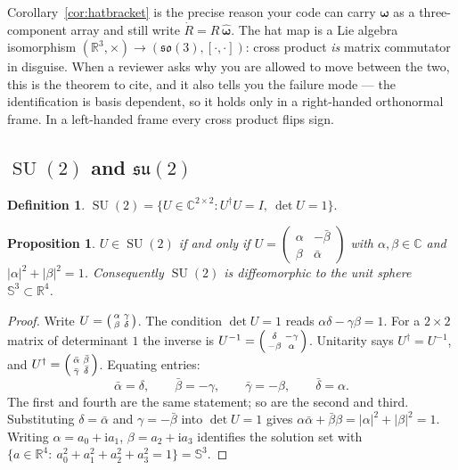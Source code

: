 \documentclass[11pt]{article}
\DeclareMathOperator{\SU}{SU}
\newcommand{\so}{\mathfrak{so}}
\newcommand{\su}{\mathfrak{su}}
\newcommand{\R}{\mathbb{R}}
\newcommand{\C}{\mathbb{C}}
\newcommand{\Sph}{\mathbb{S}}
\newcommand{\hatmap}[1]{\widehat{#1}}
\newcommand{\ii}{\mathrm{i}}
\theoremstyle{plain}
\newtheorem{proposition}[theorem]{Proposition}
\theoremstyle{definition}
\newtheorem{definition}[theorem]{Definition}
\begin{document}
\begin{practical}
Corollary~\ref{cor:hatbracket} is the precise reason your code can carry $\bm\omega$ as a
three-component array and still write $\dot R=R\,\hatmap{\bm\omega}$. The hat map is a Lie algebra
isomorphism $(\R^3,\times)\to(\so(3),[\cdot,\cdot])$: cross product \emph{is} matrix commutator in
disguise. When a reviewer asks why you are allowed to move between the two, this is the theorem to
cite, and it also tells you the failure mode --- the identification is basis dependent, so it holds
only in a right-handed orthonormal frame. In a left-handed frame every cross product flips sign.
\end{practical}

\subsection{$\SU(2)$ and $\su(2)$}

\begin{definition}
$\SU(2)=\{U\in\C^{2\times2}: U^{\dagger}U=I,\ \det U=1\}$.
\end{definition}

\begin{proposition}\label{prop:su2form}
$U\in\SU(2)$ if and only if
$U=\begin{pmatrix}\alpha&-\bar\beta\\ \beta&\bar\alpha\end{pmatrix}$
with $\alpha,\beta\in\C$ and $|\alpha|^2+|\beta|^2=1$. Consequently $\SU(2)$ is diffeomorphic to
the unit sphere $\Sph^3\subset\R^4$.
\end{proposition}

\begin{proof}
Write $U=\begin{psmallmatrix}\alpha&\gamma\\\beta&\delta\end{psmallmatrix}$. The condition
$\det U=1$ reads $\alpha\delta-\gamma\beta=1$. For a $2\times2$ matrix of determinant $1$ the
inverse is $U^{-1}=\begin{psmallmatrix}\delta&-\gamma\\-\beta&\alpha\end{psmallmatrix}$. Unitarity
says $U^{\dagger}=U^{-1}$, and
$U^{\dagger}=\begin{psmallmatrix}\bar\alpha&\bar\beta\\\bar\gamma&\bar\delta\end{psmallmatrix}$.
Equating entries:
\[
\bar\alpha=\delta,\qquad \bar\beta=-\gamma,\qquad \bar\gamma=-\beta,\qquad \bar\delta=\alpha .
\]
The first and fourth are the same statement; so are the second and third. Substituting
$\delta=\bar\alpha$ and $\gamma=-\bar\beta$ into $\det U=1$ gives
$\alpha\bar\alpha+\bar\beta\beta=|\alpha|^2+|\beta|^2=1$. Writing
$\alpha=a_0+\ii a_1$, $\beta=a_2+\ii a_3$ identifies the solution set with
$\{a\in\R^4:\ a_0^2+a_1^2+a_2^2+a_3^2=1\}=\Sph^3$.
\end{proof}
\end{document}
